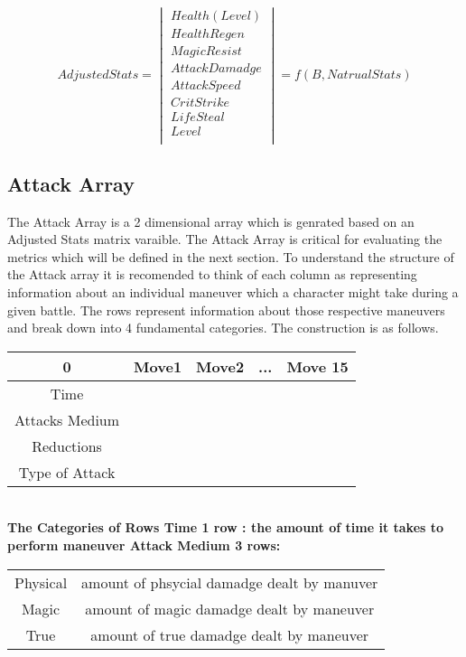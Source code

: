 \documentclass{article}
\begin{document}
\begin{equation}
Adjusted Stats = 
\begin{vmatrix}
	Health(Level)\\
	Health Regen\\
	Magic Resist \\
	Attack Damadge \\
	Attack Speed \\
	Crit Strike \\
	Life Steal \\
	Level \\
\end{vmatrix} = f(B,Natrual Stats)
\end{equation}

\newpage
\subsection{Attack Array}
The Attack Array is a 2 dimensional array which is genrated based on an Adjusted Stats matrix varaible.  The Attack Array is critical for evaluating the metrics which will be defined in the next section.  To understand the structure of the Attack array it is recomended to think of each column as representing information about an individual maneuver which a character might take during a given battle. The rows represent information about those respective maneuvers and break down into 4 fundamental categories.  The construction is as follows.\\

\begin{tabular}{|c|c|c|c|c|} 
0 & Move1 & Move2 & ...& Move 15\\  \hline
Time\\  \hline
Attacks Medium \\  \hline 
Reductions\\  \hline
Type of Attack\\  \hline
\end{tabular} \\
\bf{The Categories of Rows}
Time 1 row : the amount of time it takes to perform maneuver
Attack Medium 3 rows:
\begin{tabular}{cc}
Physical & amount of phsycial damadge dealt by manuver\\
Magic & amount of magic damadge dealt by maneuver\\
True & amount of true damadge dealt by maneuver\\
\end{tabular}
\end{document}
